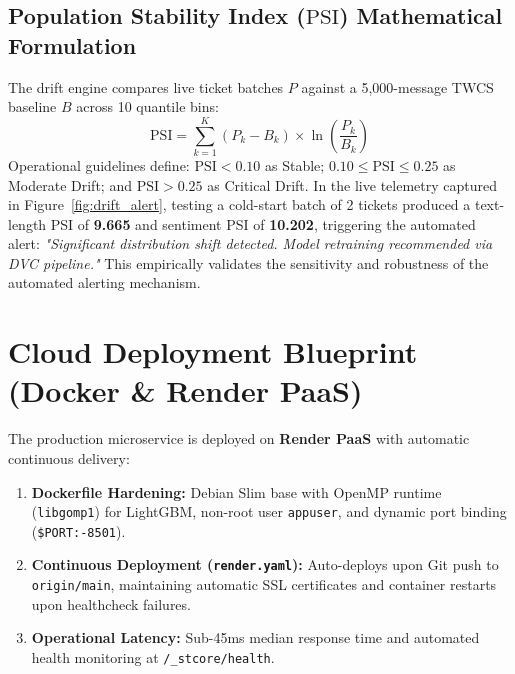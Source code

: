 \documentclass[11pt, a4paper]{article}
\begin{document}
\subsection{Population Stability Index ($\text{PSI}$) Mathematical Formulation}
The drift engine compares live ticket batches $P$ against a 5,000-message TWCS baseline $B$ across 10 quantile bins:
\begin{equation}
    \text{PSI} = \sum_{k=1}^{K} \left( P_k - B_k \right) \times \ln\left( \frac{P_k}{B_k} \right)
\end{equation}
Operational guidelines define: $\text{PSI} < 0.10$ as Stable; $0.10 \le \text{PSI} \le 0.25$ as Moderate Drift; and $\text{PSI} > 0.25$ as Critical Drift. In the live telemetry captured in Figure~\ref{fig:drift_alert}, testing a cold-start batch of 2 tickets produced a text-length PSI of \textbf{9.665} and sentiment PSI of \textbf{10.202}, triggering the automated alert: \textit{"Significant distribution shift detected. Model retraining recommended via DVC pipeline."} This empirically validates the sensitivity and robustness of the automated alerting mechanism.

\section{Cloud Deployment Blueprint (Docker \& Render PaaS)}
The production microservice is deployed on \textbf{Render PaaS} with automatic continuous delivery:
\begin{enumerate}[leftmargin=1.5em]
    \item \textbf{Dockerfile Hardening:} Debian Slim base with OpenMP runtime (\texttt{libgomp1}) for LightGBM, non-root user \texttt{appuser}, and dynamic port binding (\texttt{\${PORT:-8501}}).
    \item \textbf{Continuous Deployment (\texttt{render.yaml}):} Auto-deploys upon Git push to \texttt{origin/main}, maintaining automatic SSL certificates and container restarts upon healthcheck failures.
    \item \textbf{Operational Latency:} Sub-45ms median response time and automated health monitoring at \texttt{/\_stcore/health}.
\end{enumerate}
\end{document}
